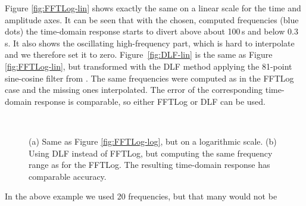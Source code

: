 \documentclass[extra, camera,%
]{gji}
\newlength{\fwidth}
\begin{document}
Figure \ref{fig:FFTLog-lin} shows exactly the same on a linear scale for the
time and amplitude axes. It can be seen that with the chosen, computed
frequencies (blue dots) the time-domain response starts to divert above about
100\,s and below 0.3\,s. It also shows the oscillating high-frequency part,
which is hard to interpolate and we therefore set it to zero.
Figure~\ref{fig:DLF-lin} is the same as Figure \ref{fig:FFTLog-lin}, but
transformed with the DLF method applying the 81-point sine-cosine filter from
\cite{GEO.09.Key}. The same frequencies were computed as in the FFTLog case and
the missing ones interpolated. The error of the corresponding time-domain
response is comparable, so either FFTLog or DLF can be used.
%
\begin{figure}
  \centering
  \hfill
  \\
  \caption{(a) Same as Figure \ref{fig:FFTLog-log}, but on a logarithmic scale.
  (b) Using DLF instead of FFTLog, but computing the same frequency range as
  for the FFTLog. The resulting time-domain response has comparable accuracy.}
  \label{fig:lin-lin}
\end{figure}
%
In the above example we used 20 frequencies, but that many would not be
\end{document}
